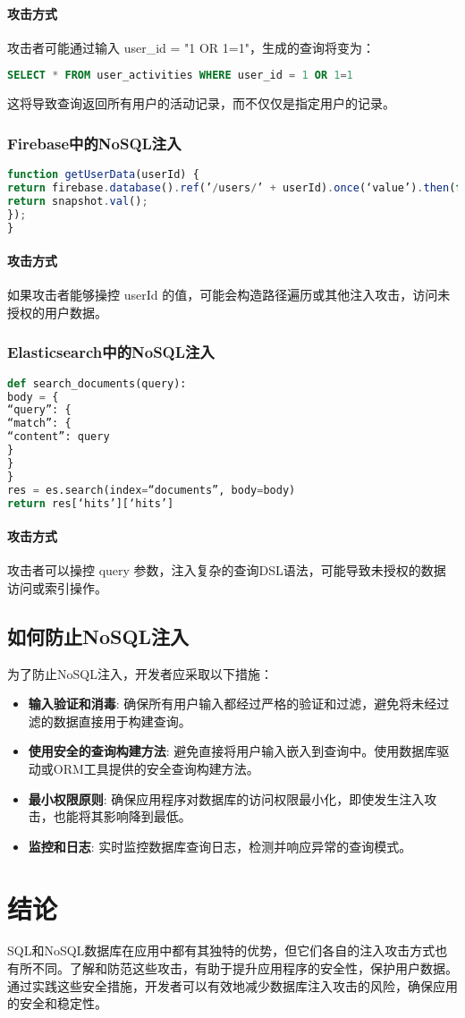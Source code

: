 \documentclass{article}
\begin{document}
\paragraph{攻击方式}
攻击者可能通过输入 user\_id = "1 OR 1=1"，生成的查询将变为：
\begin{lstlisting}[language=SQL]
SELECT * FROM user_activities WHERE user_id = 1 OR 1=1
\end{lstlisting}
这将导致查询返回所有用户的活动记录，而不仅仅是指定用户的记录。

\subsubsection{Firebase中的NoSQL注入}
\begin{lstlisting}[language=JavaScript, caption=Firebase中的NoSQL注入]
function getUserData(userId) {
return firebase.database().ref(’/users/’ + userId).once(‘value’).then(function(snapshot) {
return snapshot.val();
});
}
\end{lstlisting}

\paragraph{攻击方式}
如果攻击者能够操控 userId 的值，可能会构造路径遍历或其他注入攻击，访问未授权的用户数据。

\subsubsection{Elasticsearch中的NoSQL注入}
\begin{lstlisting}[language=Python, caption=Elasticsearch中的NoSQL注入]
def search_documents(query):
body = {
“query”: {
“match”: {
“content”: query
}
}
}
res = es.search(index=“documents”, body=body)
return res[‘hits’][‘hits’]
\end{lstlisting}

\paragraph{攻击方式}
攻击者可以操控 query 参数，注入复杂的查询DSL语法，可能导致未授权的数据访问或索引操作。

\subsection{如何防止NoSQL注入}
为了防止NoSQL注入，开发者应采取以下措施：
\begin{itemize}
\item \textbf{输入验证和消毒}: 确保所有用户输入都经过严格的验证和过滤，避免将未经过滤的数据直接用于构建查询。
\item \textbf{使用安全的查询构建方法}: 避免直接将用户输入嵌入到查询中。使用数据库驱动或ORM工具提供的安全查询构建方法。
\item \textbf{最小权限原则}: 确保应用程序对数据库的访问权限最小化，即使发生注入攻击，也能将其影响降到最低。
\item \textbf{监控和日志}: 实时监控数据库查询日志，检测并响应异常的查询模式。
\end{itemize}

\section{结论}
SQL和NoSQL数据库在应用中都有其独特的优势，但它们各自的注入攻击方式也有所不同。了解和防范这些攻击，有助于提升应用程序的安全性，保护用户数据。通过实践这些安全措施，开发者可以有效地减少数据库注入攻击的风险，确保应用的安全和稳定性。
\end{document}
